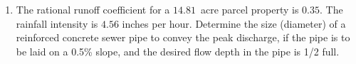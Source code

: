 \documentclass[11pt]{article}
\begin{document}
\begin{enumerate}
\item The rational runoff coefficient for a $14.81$~acre parcel property is $0.35$.  
The rainfall intensity is $4.56$ inches per hour.    
Determine the size (diameter) of a reinforced concrete sewer pipe to convey the peak discharge, if the pipe is to be laid on a 0.5\% slope, and the desired flow depth in the pipe is 1/2 full.

\end{enumerate}
\end{document}
